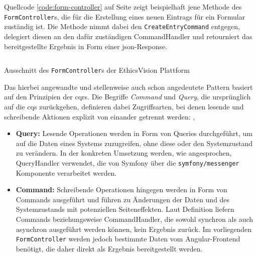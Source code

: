 \documentclass[a4paper,12pt,twoside]{scrreprt}
\begin{document}
\clearpage

Quellcode \ref{code:form-controller} auf Seite \pageref{code:form-controller} zeigt beispielhaft jene Methode des \texttt{FormController}s, die für die Erstellung eines neuen Eintrags für ein Formular zuständig ist. Die Methode nimmt dabei den \texttt{CreateEntryCommand} entgegen, delegiert diesen an den dafür zuständigen CommandHandler und retourniert das bereitgestellte Ergebnis in Form einer \ac{json}-Response.

\begin{listing}[ht]
    \inputminted[fontsize=\footnotesize,linenos,xleftmargin=8mm,breaklines]{php}{code/Luidold_Form-Controller.php}
    \caption{Ausschnitt des \texttt{FormController}s der EthicsVision Plattform}
    \label{code:form-controller}
\end{listing}

Das hierbei angewandte und stellenweise auch schon angedeutete Pattern basiert auf den Prinzipien der \ac{cqrs}. Die Begriffe \textit{Command} und \textit{Query}, die ursprünglich auf die \ac{cqs} zurückgehen, definieren dabei Zugriffsarten, bei denen lesende und schreibende Aktionen explizit von einander getrennt werden: \cite{noauthor_cqrs_2010, fowler_commandqueryseparation_2005}, \cite[238\psq]{ingeno_software_2018}

\begin{itemize}
    \item \textbf{Query:} Lesende Operationen werden in Form von Queries durchgeführt, um auf die Daten eines Systems zuzugreifen, ohne diese oder den Systemzustand zu verändern. In der konkreten Umsetzung werden, wie angesprochen, QueryHandler verwendet, die von Symfony über die \texttt{symfony/messenger} Komponente verarbeitet werden. \cite{fowler_commandqueryseparation_2005} \cite[238\psq]{ingeno_software_2018}
    \item \textbf{Command:} Schreibende Operationen hingegen werden in Form von Commands ausgeführt und führen zu Änderungen der Daten und des Systemzustands mit potenziellen Seiteneffekten. Laut Definition liefern Commands beziehungsweise CommandHandler, die sowohl synchron als auch asynchron ausgeführt werden können, kein Ergebnis zurück. Im vorliegenden \texttt{FormController} werden jedoch bestimmte Daten vom Angular-Frontend benötigt, die daher direkt als Ergebnis bereitgestellt werden. \cite{fowler_commandqueryseparation_2005} \cite[238\psq]{ingeno_software_2018}
\end{itemize}
\end{document}
